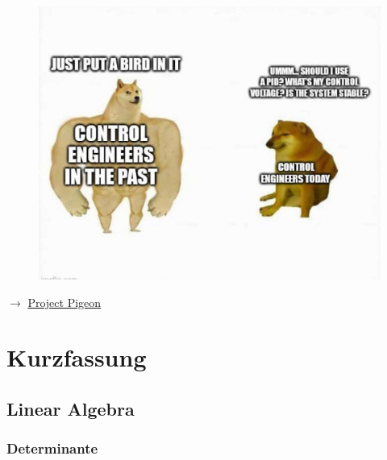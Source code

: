 \documentclass[
  10pt,
  a4paper,
  twocolumn]{article}
\numberwithin{equation}{section}
\begin{document}
\begin{figure}[H]

{\centering \includegraphics{images/rgt_meme.jpg}

}

\end{figure}

\(\rightarrow\)
\href{https://en.wikipedia.org/wiki/Project_Pigeon}{Project Pigeon}

\ifdefined\Shaded\renewenvironment{Shaded}{\begin{tcolorbox}[
  colback={shadecolor},
  boxrule=0pt,
  left=3pt,
  right=3pt,
  top=3pt,
  bottom=3pt,
  frame hidden,
  enhanced,
  breakable
]}{\end{tcolorbox}}\fi

\hypertarget{kurzfassung}{%
\section{Kurzfassung}\label{kurzfassung}}

\hypertarget{linear-algebra}{%
\subsection{Linear Algebra}\label{linear-algebra}}

\hypertarget{determinante}{%
\subsubsection{Determinante}\label{determinante}}
\end{document}
